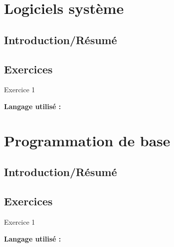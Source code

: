\section{Logiciels système}

\subsection{Introduction/Résumé}

\subsection{Exercices}

\begin{Exercice}[Durée] Exercice 1\\

\begin{conseil}
\end{conseil}
    
\begin{solution}
\textbf{Langage utilisé :}
    
\end{solution}

\end{Exercice}

\section{Programmation de base}

\subsection{Introduction/Résumé}

\subsection{Exercices}

\begin{Exercice}[Durée] Exercice 1\\

\begin{conseil}
\end{conseil}
    
\begin{solution}
\textbf{Langage utilisé :}
    
\end{solution}

\end{Exercice}

